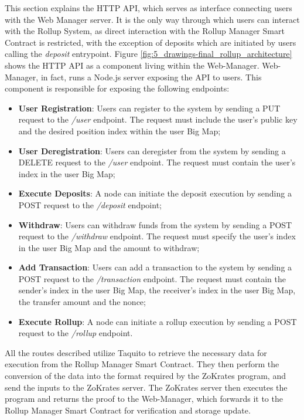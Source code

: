 This section explains the HTTP API, which serves as interface connecting users with the Web Manager server. It is the only way through which users can interact with the Rollup System, as direct interaction with the Rollup Manager Smart Contract is restricted, with the exception of deposits which are initiated by users calling the \textit{deposit} entrypoint. Figure \ref{fig:5_drawings-final_rollup_architecture} shows the HTTP API as a component living within the Web-Manager. Web-Manager, in fact, runs a Node.js server exposing the API to users. This component is responsible for exposing the following endpoints:
\vspace{-0.11in}
\begin{itemize}
	\item \textbf{User Registration}: Users can register to the system by sending a PUT request to the \textit{/user} endpoint. The request must include the user's public key and the desired position index within the user Big Map;
	      \vspace{-0.11in}
	\item \textbf{User Deregistration}: Users can deregister from the system by sending a DELETE request to the \textit{/user} endpoint. The request must contain the user's index in the user Big Map;
	      \vspace{-0.11in}
	\item \textbf{Execute Deposits}: A node can initiate the deposit execution by sending a POST request to the \textit{/deposit} endpoint;
	      \vspace{-0.11in}
	\item \textbf{Withdraw}: Users can withdraw funds from the system by sending a POST request to the \textit{/withdraw} endpoint. The request must specify the user's index in the user Big Map and the amount to withdraw;
	      \vspace{-0.11in}
	\item \textbf{Add Transaction}: Users can add a transaction to the system by sending a POST request to the \textit{/transaction} endpoint. The request must contain the sender's index in the user Big Map, the receiver's index in the user Big Map, the transfer amount and the nonce;
	      \vspace{-0.11in}
	\item \textbf{Execute Rollup}: A node can initiate a rollup execution by sending a POST request to the \textit{/rollup} endpoint.
\end{itemize}

\noindent All the routes described utilize Taquito to retrieve the necessary data for execution from the Rollup Manager Smart Contract. They then perform the conversion of the data into the format required by the ZoKrates program, and send the inputs to the ZoKrates server. The ZoKrates server then executes the program and returns the proof to the Web-Manager, which forwards it to the Rollup Manager Smart Contract for verification and storage update.

